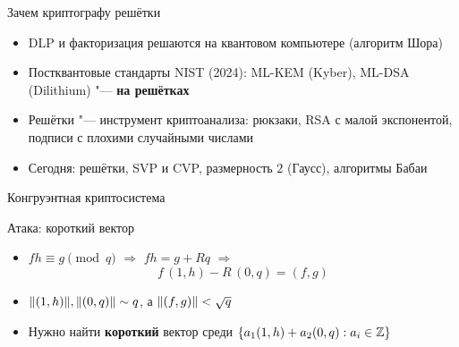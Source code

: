 \documentclass{ca-slides}
\author{}
\begin{document}
\titleframe

\begin{canvasframe}{Зачем криптографу решётки}
  \begin{itemize}
    \item DLP и факторизация решаются на квантовом компьютере (алгоритм Шора)
    \item Постквантовые стандарты NIST (2024): ML-KEM (Kyber), ML-DSA (Dilithium) "---
      \textbf{на решётках}
    \item Решётки "--- инструмент криптоанализа: рюкзаки, RSA с малой экспонентой, подписи
      с плохими случайными числами
    \item Сегодня: решётки, SVP и CVP, размерность $2$ (Гаусс), алгоритмы Бабаи
  \end{itemize}
  \notearea[0.25\textheight]
\end{canvasframe}

\begin{canvasframe}{Конгруэнтная криптосистема}
  \centering
\end{canvasframe}

\begin{canvasframe}{Атака: короткий вектор}
  \begin{itemize}
    \item $fh \equiv g \pmod q$ $\Rightarrow$ $fh = g + Rq$ $\Rightarrow$
      \[ f\,(1, h) - R\,(0, q) = (f, g) \]
    \item $\lVert(1, h)\rVert, \lVert(0, q)\rVert \sim q$, а $\lVert(f, g)\rVert < \sqrt q$
    \item Нужно найти \textbf{короткий} вектор среди $\{a_1 (1, h) + a_2 (0, q) : a_i \in \mathbb{Z}\}$
  \end{itemize}
  \penspace
\end{canvasframe}
\end{document}
